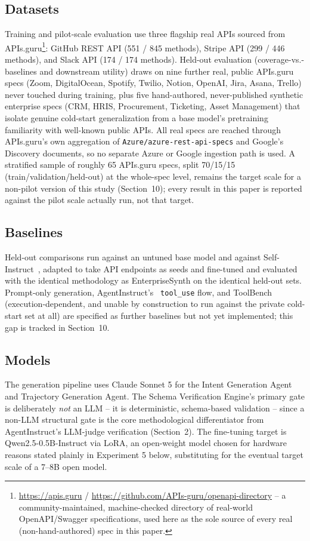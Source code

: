 \documentclass[letterpaper]{article} %
\begin{document}
\subsection{Datasets}
Training and pilot-scale evaluation use three flagship real APIs sourced from
APIs.guru\footnote{\url{https://apis.guru} / \url{https://github.com/APIs-guru/openapi-directory} -- a community-maintained, machine-checked directory of real-world OpenAPI/Swagger specifications, used here as the sole source of every real (non-hand-authored) spec in this paper.}: GitHub
REST API (551 / 845 methods), Stripe API (299 / 446 methods),
and Slack API (174 / 174 methods). Held-out evaluation (coverage-vs.-baselines and downstream
utility) draws on nine further real, public APIs.guru specs (Zoom, DigitalOcean, Spotify, Twilio,
Notion, OpenAI, Jira, Asana, Trello) never touched during training, plus five hand-authored,
never-published synthetic enterprise specs (CRM, HRIS, Procurement, Ticketing, Asset Management)
that isolate genuine cold-start generalization from a base model's pretraining familiarity with
well-known public APIs. All real specs are reached through APIs.guru's own aggregation of
\texttt{Azure/azure-rest-api-specs} and Google's Discovery documents, so no separate Azure or
Google ingestion path is used. A stratified sample of roughly 65 APIs.guru specs, split
70/15/15 (train/validation/held-out) at the whole-spec level, remains the target scale for a
non-pilot version of this study (Section~10); every result in this paper is reported against the
pilot scale actually run, not that target.

\subsection{Baselines}
Held-out comparisons run against an untuned base model and against
Self-Instruct~\cite{wang2022selfinstruct}, adapted to take API endpoints as seeds and fine-tuned
and evaluated with the identical methodology as EnterpriseSynth on the identical held-out sets.
Prompt-only generation, AgentInstruct's~\cite{mitra2024agentinstruct} \texttt{tool\_use} flow, and
ToolBench~\cite{qin2023toolbench} (execution-dependent, and unable by construction to run against
the private cold-start set at all) are specified as further baselines but not yet implemented;
this gap is tracked in Section~10.

\subsection{Models}
The generation pipeline uses Claude Sonnet 5 for the Intent Generation Agent and Trajectory
Generation Agent. The Schema Verification Engine's primary gate is deliberately \textit{not} an
LLM -- it is deterministic, schema-based validation -- since a non-LLM structural gate is the core
methodological differentiator from AgentInstruct's LLM-judge verification (Section~2). The
fine-tuning target is Qwen2.5-0.5B-Instruct via LoRA, an open-weight model chosen for hardware
reasons stated plainly in Experiment 5 below, substituting for the eventual target scale of a
7--8B open model.
\end{document}
